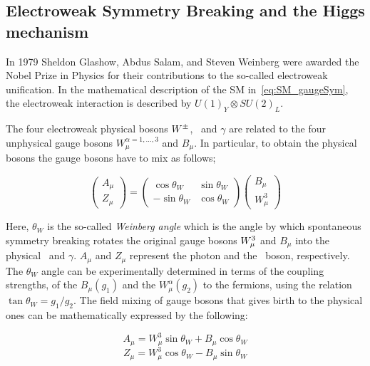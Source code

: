		\subsection{Electroweak Symmetry Breaking and the Higgs mechanism}
		\label{sec:ewksb}

			In 1979 Sheldon Glashow, Abdus Salam, and Steven Weinberg were awarded the Nobel Prize in Physics for their contributions to the so-called electroweak unification. In the mathematical description of the SM in~\ref{eq:SM_gaugeSym}, the electroweak interaction is described by $U(1)_Y \otimes SU(2)_L$. 

			The four electroweak physical bosons $W^{\pm}$, \Zboson\ and $\gamma$ are related to the four unphysical gauge bosons $W_{\mu}^{\alpha = 1,\dots,3}$ and $B_\mu$. In particular, to obtain the physical bosons the gauge bosons have to mix as follows;

			\begin{equation}
			\label{eq:mixing}
					\begin{pmatrix} A_{\mu} \\ Z_{\mu} \end{pmatrix}					
					= 
					\begin{pmatrix}
							\cos\theta_W & \sin\theta_W \\ 
							-\sin\theta_W & \cos\theta_W
						\end{pmatrix}
					\begin{pmatrix}
						B_{\mu} \\ W_{\mu}^3
						\end{pmatrix}
			\end{equation}

			\noindent Here, $\theta_W$ is the so-called \emph{Weinberg angle} which is the angle by which spontaneous symmetry breaking rotates the original gauge bosons $W_{\mu}^3$ and $B_{\mu}$ into the physical \Zboson\ and $\gamma$. $A_\mu$ and $Z_\mu$ represent the photon and the \Zboson\ boson, respectively. The $\theta_W$ angle can be experimentally determined in terms of the coupling strengths, of the $B_{\mu}(g_1)$ and the $W_{\mu}^\alpha (g_2)$ to the fermions, using the relation $\tan\theta_W = g_1 / g_2 $. 
			The field mixing of gauge bosons that gives birth to the physical ones can be mathematically expressed by the following:

			\begin{equation}
			\label{eq:photon}
				A_{\mu} = W_{\mu}^3 \sin\theta_W  + B_{\mu}\cos \theta_W 
			\end{equation}
			\begin{equation}
			\label{eq:Zboson}
				Z_{\mu} = W_{\mu}^3\cos\theta_W  - B_{\mu} \sin \theta_W
			\end{equation}

